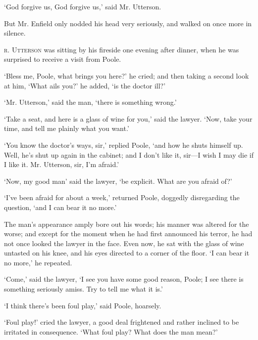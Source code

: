 \documentclass[]{novel}
\begin{document}
‘God forgive us, God forgive us,’ said Mr. Utterson.

But Mr. Enfield only nodded his head very seriously, and walked on once more in silence.
\clearpage

\label{ch:08}
\begin{ChapterStart}
\vspace*{4\nbs}
\null\vspace{0.75\nbs}
\end{ChapterStart}

\textsc{r. Utterson} was sitting by his fireside one evening after dinner, when he was surprised to receive a visit from Poole.

‘Bless me, Poole, what brings you here?’ he cried; and then taking a second look at him, ‘What ails you?’ he added, ‘is the doctor ill?’

‘Mr. Utterson,’ said the man, ‘there is something wrong.’

‘Take a seat, and here is a glass of wine for you,’ said the lawyer. ‘Now, take your time, and tell me plainly what you want.’

‘You know the doctor’s ways, sir,’ replied Poole, ‘and how he shuts himself up. Well, he’s shut up again in the cabinet; and I don’t like it, sir—I wish I may die if I like it. Mr. Utterson, sir, I’m afraid.’

‘Now, my good man’ said the lawyer, ‘be explicit. What are you afraid of?’

‘I’ve been afraid for about a week,’ returned Poole, doggedly disregarding the question, ‘and I can bear it no more.’

The man’s appearance amply bore out his words; his manner was altered for the worse; and except for the moment when he had first announced his terror, he had not once looked the lawyer in the face. Even now, he sat with the glass of wine untasted on his knee, and his eyes directed to a corner of the floor. ‘I can bear it no more,’ he repeated.

‘Come,’ said the lawyer, ‘I see you have some good reason, Poole; I see there is something seriously amiss. Try to tell me what it is.’

‘I think there’s been foul play,’ said Poole, hoarsely.

‘Foul play!’ cried the lawyer, a good deal frightened and rather inclined to be irritated in consequence. ‘What foul play? What does the man mean?’
\end{document}
